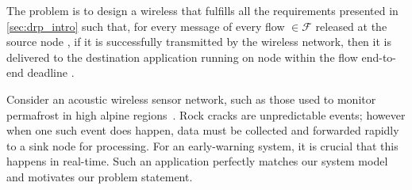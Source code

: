 The problem is to design a wireless \CPS that fulfills all the requirements presented in \cref{sec:drp_intro} such that, for every message of every flow \flowi $\in \mathcal{F}$ released at the source node \flowsrci, if it is successfully transmitted by the wireless network, then it is delivered to the destination application running on node \flowdsti within the flow end-to-end deadline \deadlinei.

Consider an acoustic wireless sensor network, such as those used to monitor permafrost in high alpine regions~\cite{weber2019decade,meyer2019IPSN}.
Rock cracks are unpredictable events; however when one such event does happen, data must be collected and forwarded rapidly to a sink node for processing. For an early-warning system, it is crucial that this happens in real-time.
Such an application perfectly matches our system model and motivates our problem statement.
